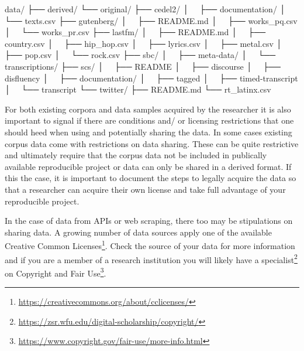 \documentclass[
  letterpaper,
]{scrbook}
\newenvironment{Shaded}{\begin{snugshade}}{\end{snugshade}}
\newcommand{\ExtensionTok}[1]{\textcolor[rgb]{0.00,0.00,0.00}{#1}}
\newcommand{\NormalTok}[1]{\textcolor[rgb]{0.00,0.00,0.00}{#1}}
\DeclareRobustCommand{\href}[2]{#2\footnote{\url{#1}}}
\begin{document}
\begin{Shaded}
\begin{Highlighting}[]
\ExtensionTok{data/}
\ExtensionTok{├──}\NormalTok{ derived/}
\ExtensionTok{└──}\NormalTok{ original/}
    \ExtensionTok{├──}\NormalTok{ cedel2/}
    \ExtensionTok{│  }\NormalTok{ ├── documentation/}
    \ExtensionTok{│  }\NormalTok{ └── texts.csv}
    \ExtensionTok{├──}\NormalTok{ gutenberg/}
    \ExtensionTok{│  }\NormalTok{ ├── README.md}
    \ExtensionTok{│  }\NormalTok{ ├── works\_pq.csv}
    \ExtensionTok{│  }\NormalTok{ └── works\_pr.csv}
    \ExtensionTok{├──}\NormalTok{ lastfm/}
    \ExtensionTok{│  }\NormalTok{ ├── README.md}
    \ExtensionTok{│  }\NormalTok{ ├── country.csv}
    \ExtensionTok{│  }\NormalTok{ ├── hip\_hop.csv}
    \ExtensionTok{│  }\NormalTok{ ├── lyrics.csv}
    \ExtensionTok{│  }\NormalTok{ ├── metal.csv}
    \ExtensionTok{│  }\NormalTok{ ├── pop.csv}
    \ExtensionTok{│  }\NormalTok{ └── rock.csv}
    \ExtensionTok{├──}\NormalTok{ sbc/}
    \ExtensionTok{│  }\NormalTok{ ├── meta{-}data/}
    \ExtensionTok{│  }\NormalTok{ └── transcriptions/}
    \ExtensionTok{├──}\NormalTok{ scs/}
    \ExtensionTok{│  }\NormalTok{ ├── README}
    \ExtensionTok{│  }\NormalTok{ ├── discourse}
    \ExtensionTok{│  }\NormalTok{ ├── disfluency}
    \ExtensionTok{│  }\NormalTok{ ├── documentation/}
    \ExtensionTok{│  }\NormalTok{ ├── tagged}
    \ExtensionTok{│  }\NormalTok{ ├── timed{-}transcript}
    \ExtensionTok{│  }\NormalTok{ └── transcript}
    \ExtensionTok{└──}\NormalTok{ twitter/}
        \ExtensionTok{├──}\NormalTok{ README.md}
        \ExtensionTok{└──}\NormalTok{ rt\_latinx.csv}
\end{Highlighting}
\end{Shaded}

For both existing corpora and data samples acquired by the researcher it
is also important to signal if there are conditions and/ or licensing
restrictions that one should heed when using and potentially sharing the
data. In some cases existing corpus data come with restrictions on data
sharing. These can be quite restrictive and ultimately require that the
corpus data not be included in publically available reproducible project
or data can only be shared in a derived format. If this the case, it is
important to document the steps to legally acquire the data so that a
researcher can acquire their own license and take full advantage of your
reproducible project.

In the case of data from APIs or web scraping, there too may be
stipulations on sharing data. A growing number of data sources apply one
of \href{https://creativecommons.org/about/cclicenses/}{the available
Creative Common Licenses}. Check the source of your data for more
information and if you are a member of a research institution you will
likely have a
\href{https://zsr.wfu.edu/digital-scholarship/copyright/}{specialist} on
\href{https://www.copyright.gov/fair-use/more-info.html}{Copyright and
Fair Use}.
\end{document}
